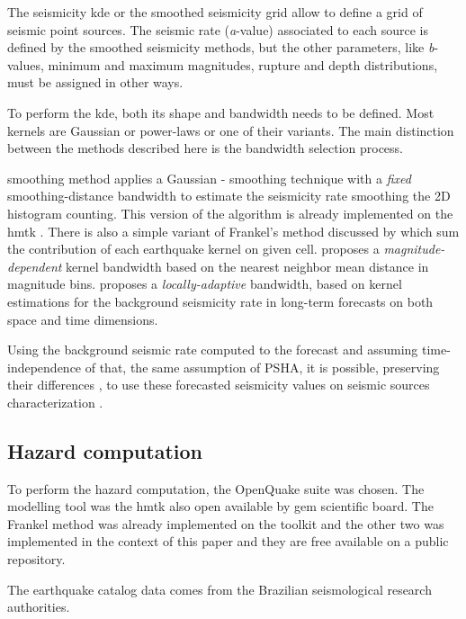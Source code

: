 \documentclass[grl]{agutex}
\begin{document}
\begin{article}
The seismicity \gls{kde} or the smoothed seismicity grid allow to define a grid of seismic point sources. The seismic rate (\emph{a}-value) associated to each source is defined by the smoothed seismicity methods, but the other parameters, like \emph{b}-values, minimum and maximum magnitudes, rupture and depth distributions, must be assigned in other ways.

To perform the \gls{kde}, both its shape and bandwidth needs to be defined. Most kernels are Gaussian or power-laws or one of their variants. The main distinction between the methods described here is the bandwidth selection process.

\citet{frankel_1995} smoothing method applies a Gaussian \citet{nadaraya_1964}-\citet{watson_1964} smoothing technique with a \emph{fixed} smoothing-distance bandwidth to estimate the seismicity rate smoothing the 2D histogram counting. This version of the algorithm is already implemented on the \gls{hmtk} \citep{weatherill_2012, weatherill_2014_1}. There is also a simple variant of Frankel's method discussed by \citet{zechar_jordan_2010} which sum the contribution of each earthquake kernel on given cell. \citet{woo_1996} proposes a \emph{magnitude-dependent} kernel bandwidth based on the nearest neighbor mean distance in magnitude bins. \citet{helmstetter_2012} proposes a \emph{locally-adaptive} bandwidth, based on kernel estimations for the background seismicity rate in long-term forecasts on both space and time dimensions.

Using the background seismic rate computed to the forecast and assuming time-independence of that, the same assumption of PSHA, it is possible, preserving their differences \citep{marzocchi_2011}, to use these forecasted seismicity values on seismic sources characterization \citep{weatherill_pagani_2014}. 


\subsection{Hazard computation}

To perform the hazard computation, the OpenQuake suite \citep{pagani_2014} was chosen. The modelling tool was the \gls{hmtk} also open available by \gls{gem} scientific board. The Frankel method was already implemented on the toolkit and the other two was implemented in the context of this paper and they are free available on a public repository.

The earthquake catalog data comes from the Brazilian seismological research authorities.



\end{article}
\end{document}
